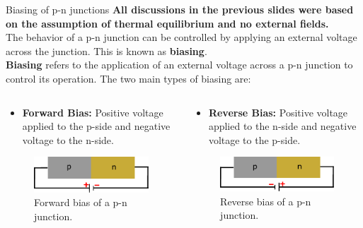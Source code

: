 \begin{frame}{Biasing of p-n junctions}
	\textbf{All discussions in the previous slides were based on the assumption of thermal equilibrium and no external fields.} \\
	The behavior of a p-n junction can be controlled by applying an external voltage across the junction. This is known as \textbf{biasing}. \\
	\textbf{Biasing} refers to the application of an external voltage across a p-n junction to control its operation. The two main types of biasing are:
	\begin{columns}
		\begin{column}{0.5\textwidth}
			\begin{itemize}
				\item \textbf{Forward Bias:} Positive voltage applied to the p-side and negative voltage to the n-side.
			\end{itemize}
			\begin{figure}
				\centering
				\includegraphics[scale=1]{fig/lec03/pn_forward_bias.pdf}
				\caption{Forward bias of a p-n junction.}
				\label{fig:forward_bias_pn_junction}
			\end{figure}
		\end{column}
		\begin{column}{0.5\textwidth}
			\begin{itemize}
				\item \textbf{Reverse Bias:} Positive voltage applied to the n-side and negative voltage to the p-side.
			\end{itemize}
			\begin{figure}
				\centering
				\includegraphics[scale=1]{fig/lec03/pn_reverse_bias.pdf}
				\caption{Reverse bias of a p-n junction.}
				\label{fig:reverse_bias_pn_junction}
			\end{figure}
		\end{column}
	\end{columns}
\end{frame}


